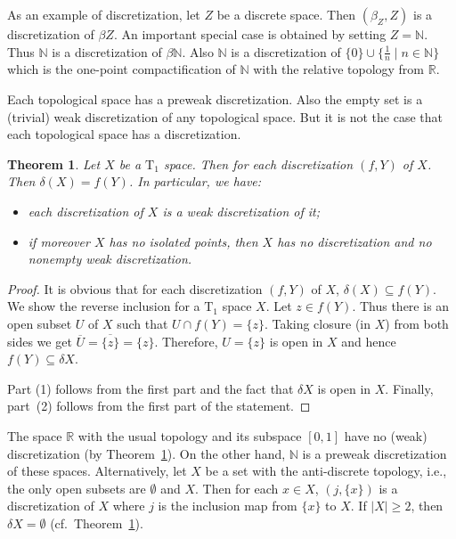 \documentclass[manuscript]{amsart}
\newtheorem{theorem}{Theorem}[section]
\theoremstyle{definition}
\begin{document}
As an example of discretization, let $Z$ be a discrete space. Then $(\beta_{Z},  Z)$ is a discretization of $\beta Z$.
An important special case is obtained by setting $Z=\mathbb{N}$. Thus $\mathbb{N}$
is  a discretization of $\beta \mathbb{N}$.
Also $\mathbb{N}$ is a discretization of $\{0\}\cup\{\frac{1}{n} \mid n\in {\mathbb{N}}\}$ which
is the one-point compactification of ${\mathbb{N}}$ with the relative topology from $\mathbb{R}$.

Each topological space has a preweak discretization.
Also the empty set is a (trivial) weak discretization of any topological space. But it is not
the case that each topological space has a  discretization.

\begin{theorem}\label{thrt1}
Let $X$ be a $\mathrm{T}_{1}$ space. Then for each discretization $(f,Y)$
of $X$. Then  $\delta(X)=f(Y)$. In particular, we have:
\begin{itemize}
\item[(1)]
each discretization of $X$ is a weak discretization of it;
\item[(2)]
if moreover $X$ has no
isolated points, then $X$ has no discretization and no nonempty weak discretization.
\end{itemize}
\end{theorem}
\begin{proof}
It is obvious that for each discretization $(f,Y)$
of $X$,  $\delta(X)\subseteq f(Y)$.
We show the reverse inclusion for a  $\mathrm{T}_{1}$ space $X$.
Let $z\in f(Y)$. Thus there is an open subset $U$ of $X$ such that
$U\cap f(Y)=\{z\}$. Taking closure (in $X$) from both sides we get
$\overline{U}=\overline{\{z\}}=\{z\}$. Therefore, $U=\{z\}$ is open in $X$ and hence
$f(Y)\subseteq \delta X$.

Part (1) follows from the first part and the fact that $\delta X$ is open in $X$.
Finally, part~(2) follows from the first part of the statement.
\end{proof}

The space $\mathbb{R}$ with the usual topology and its subspace $[0, 1]$
have no (weak) discretization (by Theorem~\ref{thrt1}).
On the other hand, $\mathbb{N}$ is a
preweak discretization
of these spaces. Alternatively, let $X$ be a set with the anti-discrete topology, i.e., the only open subsets are
$\emptyset$ and $X$. Then for each $x\in X$, $(j,\{x\})$ is a discretization of $X$
where $j$ is the inclusion map from $\{x\}$ to $X$. If $| X|\geq 2$, then
$\delta X=\emptyset$ (cf.~Theorem~\ref{thrt1}).
\end{document}
